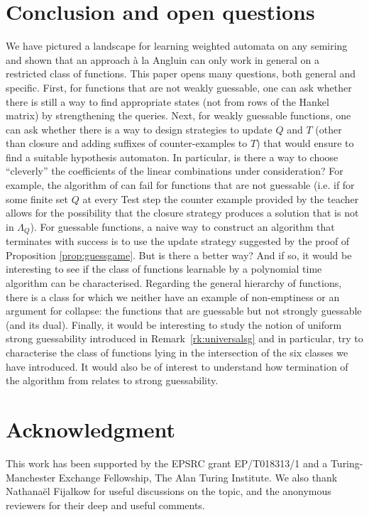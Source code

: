 \documentclass[10pt,a4paper]{amsart}
\theoremstyle{definition}
\numberwithin{equation}{section}
\numberwithin{theorem}{section}
\begin{document}
\section{Conclusion and open questions}
\label{section:conclusion}
We have pictured a landscape for learning weighted automata on any semiring and shown that an approach \`a la Angluin can only work in general on a restricted class of functions. This paper opens many questions, both general and specific. First, for functions that are not weakly guessable, one can ask whether there is still a way to find appropriate states (not from rows of the Hankel matrix) by strengthening the queries. Next, for weakly guessable functions, one can ask whether there is a way to design strategies to update $Q$ and $T$ (other than closure and adding suffixes of counter-examples to $T$) that would ensure to find a suitable hypothesis automaton. In particular, is there a way to choose ``cleverly'' the coefficients of the linear combinations under consideration? For example, the algorithm of \cite{HKRS20} can fail for functions that are not guessable (i.e. if for some finite set $Q$ at every Test step the counter example provided by the teacher allows for the possibility that the closure strategy  produces a solution that is not in $\Lambda_Q$). For guessable functions, a naive way to construct an algorithm that terminates with success is to use the update strategy suggested by the proof of Proposition \ref{prop:guessgame}. But is there a better way? And if so, it would be interesting to see if the class of functions learnable by a polynomial time algorithm can be characterised. Regarding the general hierarchy of functions, there is a class for which we neither have an example of non-emptiness or an argument for collapse: the functions that are guessable but not strongly guessable (and its dual). Finally, it would be interesting to study the notion of uniform strong guessability introduced in Remark~\ref{rk:universalsg} and in particular, try to characterise the class of functions lying in the intersection of the six classes we have introduced. It would also be of interest to understand how termination of the algorithm from \cite{HKRS20} relates to strong guessability.  

\section*{Acknowledgment}
This work has been supported by the EPSRC grant EP/T018313/1 and a Turing-Manchester Exchange Fellowship, The Alan Turing Institute. We also thank Nathana\"el Fijalkow for useful discussions on the topic, and the anonymous reviewers for their deep and useful comments.
\end{document}

